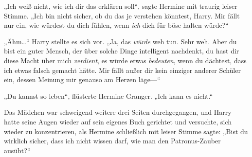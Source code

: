 „Ich weiß nicht, wie ich dir das erklären soll“, sagte Hermine mit traurig leiser Stimme. „Ich bin nicht sicher, ob du das je verstehen könntest, Harry. Mir fällt nur ein, wie würdest du dich fühlen, wenn \emph{ich} dich für böse halten würde?“

„Ähm…“ Harry stellte es sich vor. „Ja, das \emph{würde} weh tun. Sehr weh. Aber du bist ein guter Mensch, der über solche Dinge intelligent nachdenkt, du hast dir diese Macht über mich \emph{verdient}, es würde etwas \emph{bedeuten}, wenn du dächtest, dass ich etwas falsch gemacht hätte. Mir fällt außer dir kein einziger anderer Schüler ein, dessen Meinung mir genauso am Herzen läge—“

„Du kannst so leben“, flüsterte Hermine Granger. „Ich kann es nicht.“

Das Mädchen war schweigend weitere drei Seiten durchgegangen, und Harry hatte seine Augen wieder auf sein eigenes Buch gerichtet und versuchte, sich wieder zu konzentrieren, als Hermine schließlich mit leiser Stimme sagte: „Bist du wirklich sicher, dass ich nicht wissen darf, wie man den Patronus-Zauber ausübt?“

